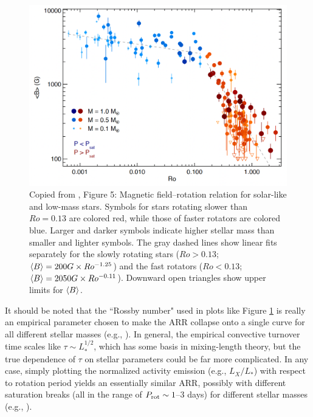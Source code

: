 \documentclass[12pt]{article} %
\begin{document}
\begin{figure}\label{fig:arr}
	\centering
	\includegraphics[width=6.5in]{ARR.png}
	\caption{Copied from \citet{Reiners2022}, Figure 5: Magnetic field–rotation relation for solar-like and low-mass stars. Symbols for stars rotating slower than $Ro=0.13$ are colored red, while those of faster rotators are colored blue. Larger and darker symbols indicate higher stellar mass than smaller and lighter symbols.  The gray dashed lines show linear fits separately for the slowly rotating stars ($Ro>0.13$;  $\left\langle B\right\rangle=200G\times Ro^{-1.25}$) and the fast rotators ($Ro<0.13$; $\left\langle B\right\rangle=2050 G \times Ro^{-0.11}$). Downward open triangles show upper limits for $\left\langle B\right\rangle$.}
\end{figure}

It should be noted that the ``Rossby number" used in plots like Figure \ref{fig:arr} is really an empirical parameter chosen to make the ARR collapse onto a single curve for all different stellar masses (e.g., \citealt{Noyes1984,Pizzolato2003,Wright2011}). In general, the empirical convective turnover time scales like $\tau\sim L_*^{1/2}$, which has some basis in mixing-length theory, but the true dependence of $\tau$ on stellar parameters could be far more complicated. In any case, simply plotting the normalized activity emission (e.g., $L_X/L_*$) with respect to rotation period yields an essentially similar ARR, possibly with different saturation breaks (all in the range of $P_{\rm{rot}}\sim1$--$3$ days) for different stellar masses (e.g., \citealt{Pizzolato2003}).
\end{document}
